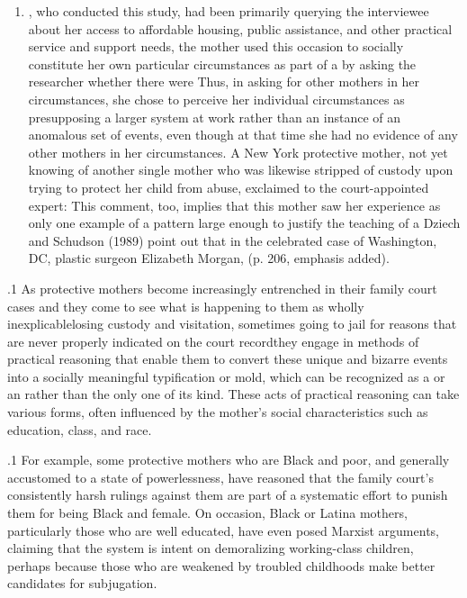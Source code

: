 \documentclass[11pt, twoside]{article}
\begin{document}
{{\begin{enumerate}
\item[)] , who conducted this study, had been primarily querying the
interviewee about her access to affordable housing, public
assistance, and other practical service and support needs, the
mother used this occasion to socially constitute her own
particular circumstances as part of a  by asking the
researcher whether there were  Thus, in asking for other mothers in her
circumstances, she chose to perceive her individual
circumstances as presupposing a larger system at work rather
than an instance of an anomalous set of events, even though at
that time she had no evidence of any other mothers in her
circumstances.
\enumsItem{} A New York protective mother, not yet knowing of another
single mother who was likewise stripped of custody upon
trying to protect her child from abuse, exclaimed to the
court-appointed expert:  This comment, too, implies that
this mother saw her experience as only one example of a
pattern large enough to justify the teaching of a 
\enumsItem{}  Dziech and Schudson (1989) point out that in the celebrated
case of Washington, DC, plastic surgeon Elizabeth Morgan,
 (p. 206, emphasis added).

\end{enumerate}

}%

\p.1{%
As protective mothers become increasingly entrenched in their family court cases and they come to see what is happening to them as wholly
inexplicable\mdash{}losing custody and visitation, sometimes going to jail for
reasons that are never properly indicated on the court record\mdash{}they
engage in methods of practical reasoning that enable them to convert
these unique and bizarre events into a socially meaningful typification or
mold, which can be recognized as a  or an  rather than
the only one of its kind. These acts of practical reasoning can take various forms, often influenced by the mother’s social characteristics such
as education, class, and race.
}%

\p.1{%
For example, some protective mothers who are Black and poor, and
generally accustomed to a state of powerlessness, have reasoned that
the family court’s consistently harsh rulings against them are part of a
systematic effort to punish them for being Black and female. On occasion, Black or Latina mothers, particularly those who are well educated,
have even posed Marxist arguments, claiming that the system is intent on demoralizing working-class children, perhaps because those
who are weakened by troubled childhoods make better candidates for
subjugation.
}%

}
\end{document}
